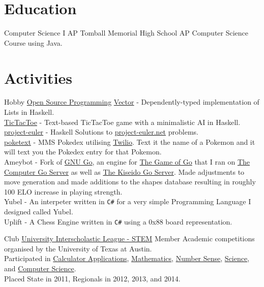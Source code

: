 \documentclass[10pt,letterpaper,sans]{moderncv}
\newcommand{\wlink}[2]{\textcolor[HTML]{0020B6}{\href{#1}{#2}}}
\begin{document}
\makecvtitle{}

\section{Education}
        {Computer Science I AP}
        {Tomball Memorial High School}
        {}{}
        {
        AP Computer Science Course using Java.}

\section{Activities}
        {Hobby}
        {\wlink{https://github.com/chessai}{Open Source Programming}}
        {}{}{
        \wlink{https://github.com/chessai/Vector}{Vector} - Dependently-typed implementation of Lists in Haskell. \\ %
        \wlink{https://github.com/chessai/TicTacToe}{TicTacToe} - Text-based TicTacToe game with a minimalistic AI in Haskell. \\ %
        \wlink{https://github.com/chessai/project-euler}{project-euler} - Haskell Solutions to \wlink{https://projecteuler.net/}{project-euler.net} problems. \\ %
        \wlink{https://github.com/chessai/poketext}{poketext} - MMS Pokedex utilising \wlink{https://www.twilio.com/sms}{Twilio}. Text it the name of a Pokemon and it will text you the Pokedex entry for that Pokemon. \\ %
        Ameybot - Fork of \wlink{https://www.gnu.org/software/gnugo/}{GNU Go}, an engine for \wlink{https://en.wikipedia.org/wiki/Go_(game)}{The Game of Go} that I ran on \wlink{http://yss-aya.com/cgos/}{The Computer Go Server} as well as \wlink{https://www.gokgs.com/}{The Kiseido Go Server}. Made adjustments to move generation and made additions to the shapes database resulting in roughly 100 ELO increase in playing strength. \\
        Yubel - An interpeter written in \texttt{C\#} for a very simple Programming Language I designed called Yubel. \\
        Uplift - A Chess Engine written in \texttt{C\#} using a 0x88 board representation.
}

        {Club}
        {\wlink{http://www.uiltexas.org/academics/stem}{University Interscholastic League - STEM}}
        {Member}{}{
        Academic competitions organised by the University of Texas at Austin. \\ %
        Participated in %
        \wlink{http://www.uiltexas.org/academics/stem/calculator-applications}{Calculator Applications}, %
        \wlink{http://www.uiltexas.org/academics/stem/mathematics}{Mathematics}, %
        \wlink{http://www.uiltexas.org/academics/stem/number-sense}{Number Sense}, %
        \wlink{http://www.uiltexas.org/academics/stem/science}{Science}, and %
        \wlink{http://www.uiltexas.org/academics/stem/computer-science}{Computer Science}. \\ %
        Placed State in 2011, Regionals in 2012, 2013, and 2014.
}
\end{document}
